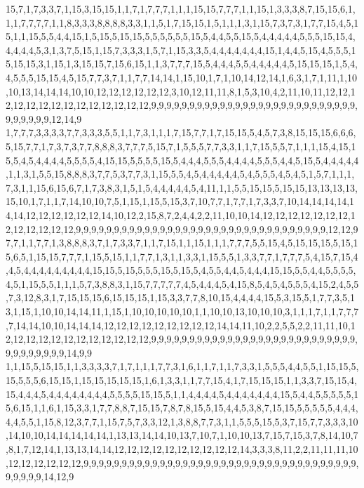 15,7,1,7,3,3,7,1,15,3,15,15,1,1,7,1,7,7,7,1,1,1,15,15,7,7,7,1,1,15,1,3,3,3,8,7,15,15,6,1,1,1,7,7,7,7,1,1,8,3,3,3,8,8,8,8,3,3,1,1,5,1,7,15,15,1,5,1,1,1,3,1,15,7,3,7,3,1,7,7,15,4,5,15,1,1,15,5,5,4,4,15,1,5,15,5,15,15,5,5,5,5,5,5,15,5,4,4,5,5,15,5,4,4,4,4,4,5,5,5,15,15,4,4,4,4,4,5,3,1,3,7,5,15,1,15,7,3,3,3,1,5,7,1,15,3,3,5,4,4,4,4,4,4,4,15,1,4,4,5,15,4,5,5,5,15,15,15,3,1,15,1,3,15,15,7,15,6,15,1,1,3,7,7,7,15,5,4,4,4,5,5,4,4,4,4,4,5,15,15,15,1,5,4,4,5,5,5,15,15,4,5,15,7,7,3,7,1,1,7,7,14,14,1,15,10,1,7,1,10,14,12,14,1,6,3,1,7,1,11,1,10,10,13,14,14,14,10,10,12,12,12,12,12,12,3,10,12,11,11,8,1,5,3,10,4,2,11,10,11,12,12,12,12,12,12,12,12,12,12,12,12,12,12,9,9,9,9,9,9,9,9,9,9,9,9,9,9,9,9,9,9,9,9,9,9,9,9,9,9,9,9,9,9,9,9,9,12,14,9
1,7,7,7,3,3,3,3,7,7,3,3,3,5,5,1,1,7,3,1,1,1,7,15,7,7,1,7,15,15,5,4,5,7,3,8,15,15,15,6,6,6,5,15,7,7,1,7,3,7,3,7,7,8,8,8,3,7,7,7,5,15,7,1,5,5,5,7,7,3,3,1,1,7,15,5,5,7,1,1,1,15,4,15,15,5,4,5,4,4,4,4,5,5,5,5,4,15,15,5,5,5,5,15,5,4,4,4,5,5,5,4,4,4,4,5,5,5,4,4,5,15,5,4,4,4,4,4,1,1,3,1,5,5,15,8,8,8,3,7,7,5,3,7,7,3,1,15,5,5,4,5,4,4,4,4,4,5,4,5,5,5,4,5,4,5,1,5,7,1,1,1,7,3,1,1,15,6,15,6,7,1,7,3,8,3,1,5,1,5,4,4,4,4,4,5,4,11,1,1,5,5,15,15,5,15,15,13,13,13,13,15,10,1,7,1,1,7,14,10,10,7,5,1,15,1,15,5,15,3,7,10,7,7,1,7,7,1,7,3,3,7,10,14,14,14,14,14,14,12,12,12,12,12,12,14,10,12,2,15,8,7,2,4,4,2,2,11,10,10,14,12,12,12,12,12,12,12,12,12,12,12,12,12,9,9,9,9,9,9,9,9,9,9,9,9,9,9,9,9,9,9,9,9,9,9,9,9,9,9,9,9,9,9,9,9,9,12,12,9
7,7,1,1,7,7,1,3,8,8,8,3,7,1,7,3,3,7,1,1,7,15,1,1,15,1,1,1,7,7,7,5,5,15,4,5,15,15,15,5,15,15,6,5,1,15,15,7,7,7,1,15,5,15,1,1,7,7,1,3,1,1,3,3,1,15,5,5,1,3,3,7,7,1,7,7,7,5,4,15,7,15,4,4,5,4,4,4,4,4,4,4,4,4,15,15,5,15,5,5,5,15,5,15,5,4,5,5,4,4,5,4,4,4,15,15,5,5,4,4,5,5,5,5,4,5,1,15,5,5,1,1,1,5,7,3,8,8,3,1,15,7,7,7,7,7,4,5,4,4,4,5,4,15,8,5,4,5,4,5,5,5,4,15,2,4,5,5,7,3,12,8,3,1,7,15,15,15,6,15,15,15,1,15,3,3,7,7,8,10,15,4,4,4,4,15,5,3,15,5,1,7,7,3,5,13,1,15,1,10,10,14,14,11,1,15,1,10,10,10,10,10,1,1,10,10,13,10,10,10,3,1,1,1,7,1,1,7,7,7,7,14,14,10,10,14,14,14,12,12,12,12,12,12,12,12,12,14,14,11,10,2,2,5,5,2,2,11,11,10,12,12,12,12,12,12,12,12,12,12,12,12,9,9,9,9,9,9,9,9,9,9,9,9,9,9,9,9,9,9,9,9,9,9,9,9,9,9,9,9,9,9,9,9,9,9,9,14,9,9
1,1,15,5,15,15,1,1,3,3,3,3,7,1,7,1,1,1,7,7,3,1,6,1,1,7,1,1,7,3,3,1,5,5,5,4,4,5,5,1,15,15,5,15,5,5,5,6,15,15,1,15,15,15,15,15,1,6,1,3,3,1,1,7,7,15,4,1,7,15,15,15,1,1,3,3,7,15,15,4,15,4,4,4,5,4,4,4,4,4,4,4,4,5,5,5,5,15,15,5,1,1,4,4,4,4,5,4,4,4,4,4,4,4,15,5,4,4,5,5,5,5,5,15,6,15,1,1,6,1,15,3,3,1,7,7,8,8,7,15,15,7,8,7,8,15,5,15,4,4,5,3,8,7,15,15,5,5,5,5,5,4,4,4,4,4,5,5,1,15,8,12,3,7,7,1,15,7,5,7,3,3,12,1,3,8,8,7,7,3,1,1,5,5,5,15,5,3,7,15,7,7,3,3,3,10,14,10,10,14,14,14,14,14,1,13,13,14,14,10,13,7,10,7,1,10,10,13,7,15,7,15,3,7,8,14,10,7,8,1,7,12,14,1,13,13,14,14,12,12,12,12,12,12,12,12,12,12,14,3,3,3,8,11,2,2,11,11,11,10,12,12,12,12,12,12,9,9,9,9,9,9,9,9,9,9,9,9,9,9,9,9,9,9,9,9,9,9,9,9,9,9,9,9,9,9,9,9,9,9,9,9,9,9,9,9,9,14,12,9
